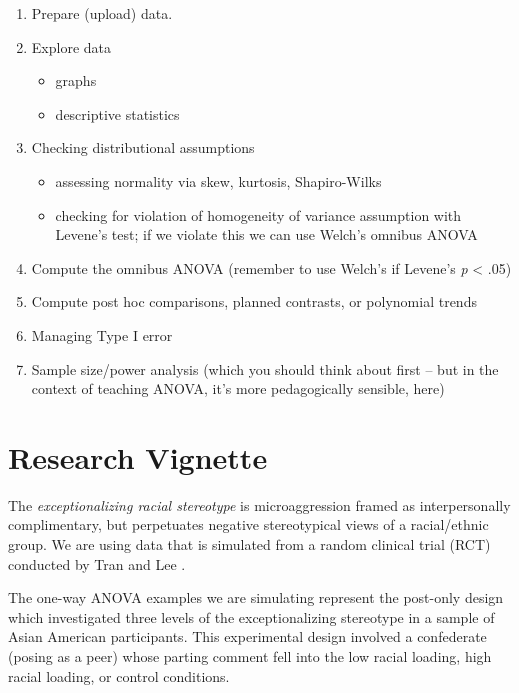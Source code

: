 \documentclass[
  11pt,
]{book}
\providecommand{\tightlist}{%
  \setlength{\itemsep}{0pt}\setlength{\parskip}{0pt}}
\begin{document}
\begin{enumerate}
\def\labelenumi{\arabic{enumi}.}
\tightlist
\item
  Prepare (upload) data.
\item
  Explore data

  \begin{itemize}
  \tightlist
  \item
    graphs
  \item
    descriptive statistics
  \end{itemize}
\item
  Checking distributional assumptions

  \begin{itemize}
  \tightlist
  \item
    assessing normality via skew, kurtosis, Shapiro-Wilks
  \item
    checking for violation of homogeneity of variance assumption with Levene's test; if we violate this we can use Welch's omnibus ANOVA
  \end{itemize}
\item
  Compute the omnibus ANOVA (remember to use Welch's if Levene's \emph{p} \textless{} .05)
\item
  Compute post hoc comparisons, planned contrasts, or polynomial trends
\item
  Managing Type I error
\item
  Sample size/power analysis (which you should think about first -- but in the context of teaching ANOVA, it's more pedagogically sensible, here)
\end{enumerate}

\hypertarget{research-vignette-4}{%
\section{Research Vignette}\label{research-vignette-4}}

The \emph{exceptionalizing racial stereotype} is microaggression framed as interpersonally complimentary, but perpetuates negative stereotypical views of a racial/ethnic group. We are using data that is simulated from a random clinical trial (RCT) conducted by Tran and Lee \citeyearpar{tran_you_2014}.

The one-way ANOVA examples we are simulating represent the post-only design which investigated three levels of the exceptionalizing stereotype in a sample of Asian American participants. This experimental design involved a confederate (posing as a peer) whose parting comment fell into the low racial loading, high racial loading, or control conditions.
\end{document}
